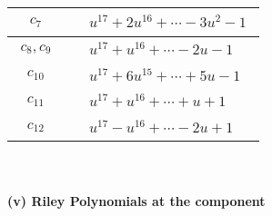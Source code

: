 \documentclass[1p]{elsarticle_modified}
\theoremstyle{definition}
\begin{document}
\begin{tabular}{m{50pt}|m{274pt}}
\hline $$\begin{aligned}c_{7}\end{aligned}$$&$\begin{aligned}
&u^{17}+2 u^{16}+\cdots-3 u^2-1
\end{aligned}$\\
\hline $$\begin{aligned}c_{8},c_{9}\end{aligned}$$&$\begin{aligned}
&u^{17}+u^{16}+\cdots-2 u-1
\end{aligned}$\\
\hline $$\begin{aligned}c_{10}\end{aligned}$$&$\begin{aligned}
&u^{17}+6 u^{15}+\cdots+5 u-1
\end{aligned}$\\
\hline $$\begin{aligned}c_{11}\end{aligned}$$&$\begin{aligned}
&u^{17}+u^{16}+\cdots+u+1
\end{aligned}$\\
\hline $$\begin{aligned}c_{12}\end{aligned}$$&$\begin{aligned}
&u^{17}- u^{16}+\cdots-2 u+1
\end{aligned}$\\
\hline
\end{tabular}\\~\\
\newpage\renewcommand{\arraystretch}{1}
\flushleft \textbf{(v) Riley Polynomials at the component}\newline \\
\end{document}
